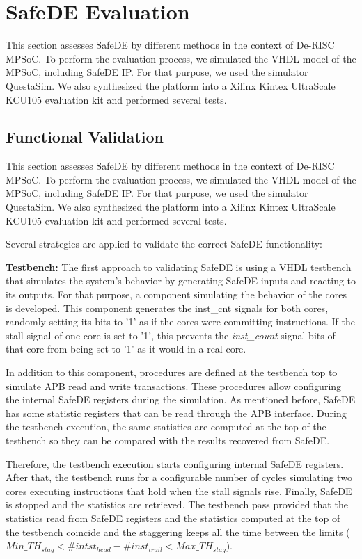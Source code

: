 \clearpage\section{SafeDE Evaluation}

This section assesses SafeDE by different methods in the context of De-RISC MPSoC. To perform the evaluation process, we simulated the VHDL model of the MPSoC, including SafeDE IP. For that purpose, we used the simulator QuestaSim. We also synthesized the platform into a Xilinx Kintex UltraScale KCU105 evaluation kit and performed several tests. 

\subsection{Functional Validation}

This section assesses SafeDE by different methods in the context of De-RISC MPSoC. To perform the evaluation process, we simulated the VHDL model of the MPSoC, including SafeDE IP. For that purpose, we used the simulator QuestaSim. We also synthesized the platform into a Xilinx Kintex UltraScale KCU105 evaluation kit and performed several tests. 

Several strategies are applied to validate the correct SafeDE functionality:

\textbf{Testbench:} The first approach to validating SafeDE is using a VHDL testbench that simulates the system's behavior by generating SafeDE inputs and reacting to its outputs. For that purpose, a component simulating the behavior of the cores is developed. This component generates the inst\_cnt signals for both cores, randomly setting its bits to '1' as if the cores were committing instructions. If the stall signal of one core is set to '1', this prevents the \textit{inst\_count} signal bits of that core from being set to '1' as it would in a real core. 

In addition to this component,  procedures are defined at the testbench top to simulate APB read and write transactions. These procedures allow configuring the internal SafeDE registers during the simulation. As mentioned before, SafeDE has some statistic registers that can be read through the APB interface. During the testbench execution, the same statistics are computed at the top of the testbench so they can be compared with the results recovered from SafeDE. 

Therefore, the testbench execution starts configuring internal SafeDE registers. After that, the testbench runs for a configurable number of cycles simulating two cores executing instructions that hold when the stall signals rise. Finally, SafeDE is stopped and the statistics are retrieved. The testbench pass provided that the statistics read from SafeDE registers and the statistics computed at the top of the testbench coincide and the staggering keeps all the time between the limits ($Min\_TH_{stag} < \#intst_{head} - \#inst_{trail} < Max\_TH_{stag}$).

